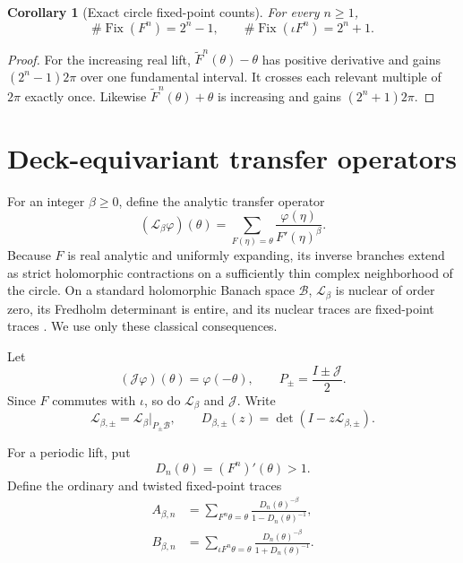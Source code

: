 \documentclass[11pt]{article}
\newtheorem{corollary}[theorem]{Corollary}
\theoremstyle{definition}
\theoremstyle{remark}
\newcommand{\Fix}{\operatorname{Fix}}
\newcommand{\cL}{\mathcal L}
\newcommand{\cB}{\mathcal B}
\newcommand{\iotaop}{\mathcal J}
\begin{document}
\begin{corollary}[Exact circle fixed-point counts]
\label{cor:circle-counts}
For every $n\ge1$,
\begin{equation}\label{eq:circle-counts}
 \#\Fix(F^n)=2^n-1,
 \qquad
 \#\Fix(\iota F^n)=2^n+1.
\end{equation}
\end{corollary}

\begin{proof}
For the increasing real lift, $\widetilde F^n(\theta)-\theta$ has positive
derivative and gains $(2^n-1)2\pi$ over one fundamental interval.  It crosses
each relevant multiple of $2\pi$ exactly once.  Likewise
$\widetilde F^n(\theta)+\theta$ is increasing and gains
$(2^n+1)2\pi$.
\end{proof}

\section{Deck-equivariant transfer operators}
\label{sec:operators}

For an integer $\beta\ge0$, define the analytic transfer operator
\begin{equation}\label{eq:transfer}
 (\cL_\beta\varphi)(\theta)
 =\sum_{F(\eta)=\theta}
 \frac{\varphi(\eta)}{F'(\eta)^\beta}.
\end{equation}
Because $F$ is real analytic and uniformly expanding, its inverse branches
extend as strict holomorphic contractions on a sufficiently thin complex
neighborhood of the circle.  On a standard holomorphic Banach space $\cB$,
$\cL_\beta$ is nuclear of order zero, its Fredholm determinant is entire,
and its nuclear traces are fixed-point traces
\citep{Ruelle1976,BaladiRuelle1996,Baladi2000,Baladi2018}.  We use only these classical
consequences.

Let
\begin{equation}\label{eq:J}
 (\iotaop\varphi)(\theta)=\varphi(-\theta),
 \qquad
 P_\pm=\frac{I\pm\iotaop}{2}.
\end{equation}
Since $F$ commutes with $\iota$, so do $\cL_\beta$ and $\iotaop$.  Write
\begin{equation}\label{eq:sector-operators}
 \cL_{\beta,\pm}=\cL_\beta|_{P_\pm\cB},
 \qquad
 D_{\beta,\pm}(z)=\det(I-z\cL_{\beta,\pm}).
\end{equation}

For a periodic lift, put
\begin{equation}\label{eq:Dn}
 D_n(\theta)=(F^n)'(\theta)>1.
\end{equation}
Define the ordinary and twisted fixed-point traces
\begin{align}
 A_{\beta,n}
 &=\sum_{F^n\theta=\theta}
 \frac{D_n(\theta)^{-\beta}}
 {1-D_n(\theta)^{-1}},\label{eq:A-trace}\\
 B_{\beta,n}
 &=\sum_{\iota F^n\theta=\theta}
 \frac{D_n(\theta)^{-\beta}}
 {1+D_n(\theta)^{-1}}.\label{eq:B-trace}
\end{align}
\end{document}
